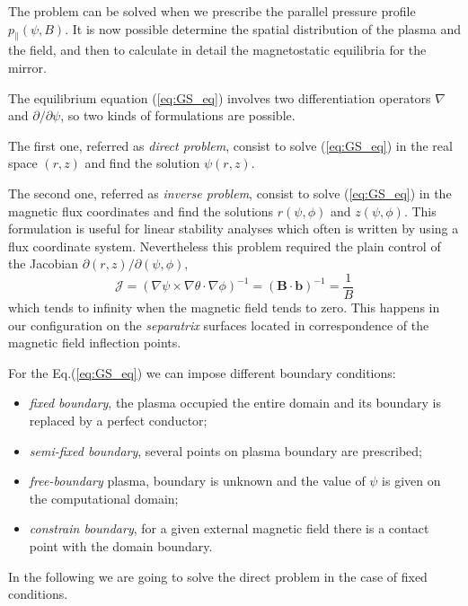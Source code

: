 The problem can be solved when we prescribe the parallel pressure profile $p_\parallel(\psi,B)$. It is now possible determine the spatial distribution of the plasma and the field, and then to calculate in detail the magnetostatic equilibria for the mirror.
\medskip

The equilibrium equation (\ref{eq:GS_eq}) involves two differentiation operators $\nabla$ and $\partial/\partial\psi$, so two kinds of formulations are possible.

The first one, referred as \textit{direct problem}, consist to solve (\ref{eq:GS_eq}) in the real space $(r,z)$ and find the solution $\psi(r,z)$.

The second one, referred as \textit{inverse problem}, consist to solve (\ref{eq:GS_eq}) in the magnetic flux coordinates and find the solutions $r(\psi,\phi)$ and $z(\psi,\phi)$. This formulation is useful for linear stability analyses which often is written by using a flux coordinate system. Nevertheless this problem required the plain control of the Jacobian $\partial (r,z)/\partial(\psi,\phi)$,
\begin{equation}
  \mathcal{J}=(\nabla\psi\times\nabla\theta\cdot\nabla\phi)^{-1}=(\mathbf{B}\cdot\mathbf{b})^{-1}=\frac{1}{B}
\end{equation}
which tends to infinity when the magnetic field tends to zero. This happens in our configuration on the \textit{separatrix} surfaces located in correspondence of the magnetic field inflection points.
\medskip

For the Eq.(\ref{eq:GS_eq}) we can impose different boundary conditions:
\begin{itemize}
  \item \textit{fixed boundary}, the plasma occupied the entire domain and its boundary is replaced by a perfect conductor;
  \item \textit{semi-fixed boundary}, several points on plasma boundary are prescribed;
  \item \textit{free-boundary} plasma, boundary is unknown and the value of $\psi$ is given on the computational domain;
  \item \textit{constrain boundary}, for a given external magnetic field there is a contact point with the domain boundary.
\end{itemize}
\medskip

In the following we are going to solve the direct problem in the case of fixed conditions.
